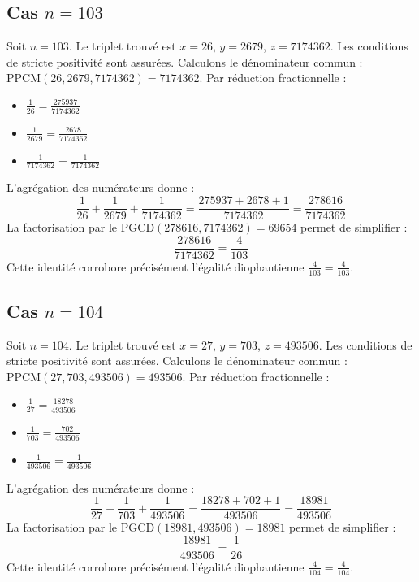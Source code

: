 \documentclass[11pt,a4paper]{article}
\begin{document}
\subsection{Cas $n = 103$}
Soit $n = 103$. Le triplet trouvé est $x = 26$, $y = 2679$, $z = 7174362$.
Les conditions de stricte positivité sont assurées.
Calculons le dénominateur commun : $\text{PPCM}(26, 2679, 7174362) = 7174362$.
Par réduction fractionnelle :
\begin{itemize}
    \item $\frac{1}{26} = \frac{275937}{7174362}$
    \item $\frac{1}{2679} = \frac{2678}{7174362}$
    \item $\frac{1}{7174362} = \frac{1}{7174362}$
\end{itemize}
L'agrégation des numérateurs donne :
$$ \frac{1}{26} + \frac{1}{2679} + \frac{1}{7174362} = \frac{275937 + 2678 + 1}{7174362} = \frac{278616}{7174362} $$
La factorisation par le $\text{PGCD}(278616, 7174362) = 69654$ permet de simplifier :
$$ \frac{278616}{7174362} = \frac{4}{103} $$
Cette identité corrobore précisément l'égalité diophantienne $\frac{4}{103} = \frac{4}{103}$.

\subsection{Cas $n = 104$}
Soit $n = 104$. Le triplet trouvé est $x = 27$, $y = 703$, $z = 493506$.
Les conditions de stricte positivité sont assurées.
Calculons le dénominateur commun : $\text{PPCM}(27, 703, 493506) = 493506$.
Par réduction fractionnelle :
\begin{itemize}
    \item $\frac{1}{27} = \frac{18278}{493506}$
    \item $\frac{1}{703} = \frac{702}{493506}$
    \item $\frac{1}{493506} = \frac{1}{493506}$
\end{itemize}
L'agrégation des numérateurs donne :
$$ \frac{1}{27} + \frac{1}{703} + \frac{1}{493506} = \frac{18278 + 702 + 1}{493506} = \frac{18981}{493506} $$
La factorisation par le $\text{PGCD}(18981, 493506) = 18981$ permet de simplifier :
$$ \frac{18981}{493506} = \frac{1}{26} $$
Cette identité corrobore précisément l'égalité diophantienne $\frac{4}{104} = \frac{4}{104}$.
\end{document}
